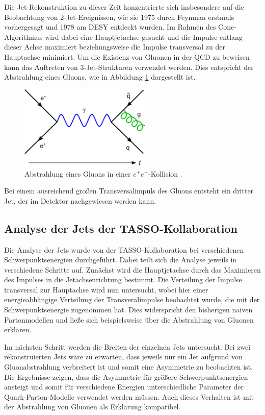 Die Jet-Rekonstruktion zu dieser Zeit konzentrierte sich insbesondere auf die Beobachtung von 2-Jet-Ereignissen, wie sie 1975 durch Feynman erstmals vorhergesagt und 1978 am DESY entdeckt wurden.
Im Rahmen des Cone-Algorithmus wird dabei eine Hauptjetachse gesucht und die Impulse entlang dieser Achse maximiert beziehungsweise die Impulse transversal zu der Hauptachse minimiert.
Um die Existenz von Gluonen in der QCD zu beweisen kann das Auftreten von 3-Jet-Strukturen verwendet werden.
Dies entspricht der Abstrahlung eines Gluons, wie in Abbildung \ref{fig:gluon} dargestellt ist.
\begin{figure}
  \centering
  \includegraphics[height=4.0cm]{ressources/gluon.png}
  \caption{Abstrahlung eines Gluons in einer $e^+ e^-$-Kollision \cite{gluon}.}
  \label{fig:gluon}
\end{figure}
Bei einem ausreichend großen Transversalimpuls des Gluons entsteht ein dritter Jet, der im Detektor nachgewiesen werden kann.

\subsection{Analyse der Jets der TASSO-Kollaboration}
Die Analyse der Jets wurde von der TASSO-Kollaboration bei verschiedenen Schwerpunktsenergien durchgeführt. 
Dabei teilt sich die Analyse jeweils in verschiedene Schritte auf.
Zunächst wird die Hauptjetachse durch das Maximieren des Impulses in die Jetachsenrichtung bestimmt.
Die Verteilung der Impulse transversal zur Hauptachse wird nun untersucht, wobei hier einer energieabhängige Verteilung der Transveralimpulse beobachtet wurde, die mit der Schwerpunktsenergie zugenommen hat. 
Dies widerspricht den bisherigen naiven Partonmodellen und ließe sich beispielsweise über die Abstrahlung von Gluonen erklären.

Im nächsten Schritt werden die Breiten der einzelnen Jets untersucht.
Bei zwei rekonstruierten Jets wäre zu erwarten, dass jeweils nur ein Jet aufgrund von Gluonabstrahlung verbreitert ist und somit eine Asymmetrie zu beobachten ist.
Die Ergebnisse zeigen, dass die Asymmetrie für größere Schwerpunktsenergien ansteigt und somit für verschiedene Energien unterschiedliche Parameter der Quark-Parton-Modelle verwendet werden müssen.
Auch dieses Verhalten ist mit der Abstrahlung von Gluonen als Erklärung kompatibel.

